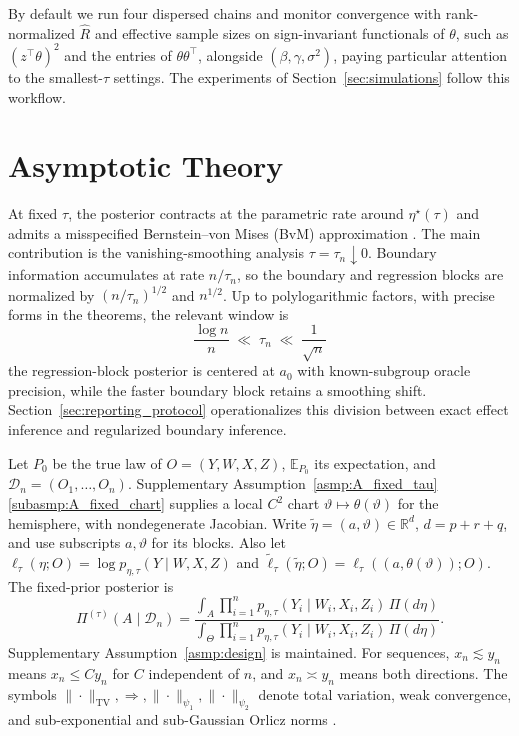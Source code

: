 \documentclass[11pt]{article}
\theoremstyle{definition}
\theoremstyle{plain}
\newcommand{\E}{\mathbb{E}}
\newcommand{\R}{\mathbb{R}}
\begin{document}
By default we run four dispersed chains and monitor convergence with rank-normalized $\widehat R$ and effective sample sizes on sign-invariant functionals of $\theta$, such as $(z^\top\theta)^2$ and the entries of $\theta\theta^\top$, alongside $(\beta,\gamma,\sigma^2)$, paying particular attention to the smallest-$\tau$ settings. The experiments of Section~\ref{sec:simulations} follow this workflow.
\section{Asymptotic Theory}
\label{sec:theorems}

At fixed $\tau$, the posterior contracts at the parametric rate around $\eta^\star(\tau)$ and admits a misspecified Bernstein--von Mises (BvM) approximation \citep{Kleijn2012,Bissiri2016}. The main contribution is the vanishing-smoothing analysis $\tau=\tau_n\downarrow0$. Boundary information accumulates at rate $n/\tau_n$, so the boundary and regression blocks are normalized by $(n/\tau_n)^{1/2}$ and $n^{1/2}$. Up to polylogarithmic factors, with precise forms in the theorems, the relevant window is
\begin{equation}
\frac{\log n}{n}\;\ll\;\tau_n\;\ll\;\frac{1}{\sqrt n}
\label{eq:window}
\end{equation}
the regression-block posterior is centered at $a_0$ with known-subgroup oracle precision, while the faster boundary block retains a smoothing shift. Section~\ref{sec:reporting_protocol} operationalizes this division between exact effect inference and regularized boundary inference.

Let $P_0$ be the true law of $O=(Y,W,X,Z)$, $\E_{P_0}$ its expectation, and $\mathcal D_n=(O_1,\dots,O_n)$. Supplementary Assumption~\ref{asmp:A_fixed_tau}\ref{subasmp:A_fixed_chart} supplies a local $C^2$ chart $\vartheta\mapsto\theta(\vartheta)$ for the hemisphere, with nondegenerate Jacobian. Write $\tilde\eta=(a,\vartheta)\in\R^d$, $d=p+r+q$, and use subscripts $a,\vartheta$ for its blocks. Also let $\ell_\tau(\eta;O)=\log p_{\eta,\tau}(Y\mid W,X,Z)$ and $\tilde\ell_\tau(\tilde\eta;O)=\ell_\tau((a,\theta(\vartheta));O)$. The fixed-prior posterior is
\begin{equation*}
    \Pi^{(\tau)}(A\mid\mathcal D_n)
    =
    \frac{\int_A \prod_{i=1}^n p_{\eta,\tau}(Y_i\mid W_i,X_i,Z_i)\,\Pi(d\eta)} {\int_\Theta \prod_{i=1}^n p_{\eta,\tau}(Y_i\mid W_i,X_i,Z_i)\,\Pi(d\eta)}.
\end{equation*}
Supplementary Assumption~\ref{asmp:design} is maintained. For sequences, $x_n\lesssim y_n$ means $x_n\le Cy_n$ for $C$ independent of $n$, and $x_n\asymp y_n$ means both directions. The symbols $\|\cdot\|_{\mathrm{TV}},\Rightarrow,\|\cdot\|_{\psi_1},\|\cdot\|_{\psi_2}$ denote total variation, weak convergence, and sub-exponential and sub-Gaussian Orlicz norms \citep{Vershynin_2018}.
\end{document}

